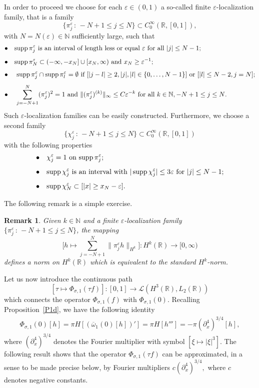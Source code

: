 \documentclass[11pt,reqno]{amsart}
\numberwithin{equation}{section}
\newcommand{\0}{\Omega}
\newcommand{\e}{\varepsilon}
\newcommand{\p}{\partial}
\newcommand{\ov}{\overline}
\newcommand{\oo}{\ov\omega}
\newcommand{\kL}{\mathcal{L}}
\newcommand{\R}{\mathbb{R}}
\newcommand{\N}{\mathbb{N}}
\DeclareMathOperator{\supp}{supp}
\newtheorem{rem}[thm]{Remark}
\numberwithin{equation}{section}
\begin{document}
In order to proceed we choose for each $\e\in(0,1)$ a so-called finite $\e$-localization family, that is  a family  
\[\{\pi_j^\e\,:\, -N+1\leq j\leq N\}\subset  C^\infty_0(\R,[0,1]),\]
with $N=N(\e)\in\N $ sufficiently large, such that
\begin{align}
\bullet\,\,\,\, \,\,  & \text{$ \supp \pi_j^\e $ is an interval of length less or equal $\e$ for all $|j|\leq N-1$;}
\label{i}\\[1ex]
\bullet\,\,\,\, \,\, &\text{$ \supp \pi_{N}^\e\subset(-\infty,-x_{N}]\cup [x_N,\infty)$  and $x_{N}\geq\e^{-1}$;}
\label{ii}\\[1ex]
\bullet\,\,\,\, \,\, &\text{ $\supp \pi_j^\e\cap\supp \pi_l^\e=\emptyset$ if $[|j-l|\geq2, |j|, |l|\in\{0,\dots, N-1\}]$ or $[|l|\leq N-2, j=N];$} \label{iii}\\[1ex]
\bullet\,\,\,\, \,\, &\text{ $\sum_{j=-N+1}^N(\pi_j^\e)^2=1$ and $\|(\pi_j^\e)^{(k)}\|_\infty\leq C\e^{-k}$ for all $ k\in\N, -N+1\leq j\leq N$.}\label{v} 
\end{align} 
 Such $\e$-localization families can be easily constructed.
Furthermore, we choose   a second family   \[\{\chi_j^\e\,:\, -N+1\leq j\leq N\}\subset  C^\infty_0(\R,[0,1]) \] with the following properties
\begin{align}
\bullet\,\,\,\, \,\,  &\text{$\chi_j^\e=1$ on $\supp \pi_j^\e$;}\label{c1}\\[1ex]
\bullet\,\,\,\, \,\,  &\text{$ \supp \chi_j^\e$ is an interval with $|\supp\chi_j^\e|\leq 3\e$ for $|j|\leq N-1$;}\label{c2}\\[1ex]
\bullet\,\,\,\, \,\,  &\text{$\supp\chi_N^\e\subset [|x|\geq x_N-\e]$.} \label{c3}
\end{align}

The following remark is a simple exercise.
\begin{rem}\label{R:3}
 Given  $k\in\N$ and a finite $\e$-localization family  $\{\pi_j^\e\,:\, -N+1\leq j\leq N\}$, the mapping
 \[
\Big[h\mapsto \sum_{j=-N+1}^ N\|\pi_j^\e h\|_{H^k}\Big]:H^k(\R)\to[0,\infty)
\]
defines a norm on $H^k(\R) $ which is equivalent to the standard $H^k$-norm. 
\end{rem}
 
 


Let us now introduce the continuous path
\[
[\tau\mapsto \Phi_{\sigma,1}(\tau f)]:[0,1]\to \kL(H^3(\R),L_2(\R))
\]
which connects  the operator $\Phi_{\sigma,1}(f)$ with   $\Phi_{\sigma,1}(0)$.
Recalling Proposition~\ref{P1d}, we have the following identity
\begin{align*}
 \Phi_{\sigma,1}(0)[h]=\pi H[(\oo_1(0)[h])']= \pi H[h''']=-\pi (\p_x^4)^{3/4}[h],
\end{align*}
where   $(\p_x^4)^{3/4}$ denotes the Fourier multiplier with symbol $[\xi\mapsto |\xi|^3].$
The following result   shows that  the operator $\Phi_{\sigma,1}(\tau f)$ can be approximated, in a sense to be made precise below,
by  Fourier multipliers $c(\p_x^4)^{3/4},$ where $c$ denotes negative constants.  
\end{document}
